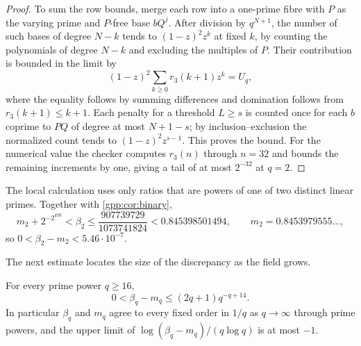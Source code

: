 \begin{proof}
To sum the row bounds, merge each row into a one-prime fibre with $P$ as the varying
prime and $P$-free base $bQ^j$. After division by $q^{N+1}$, the number of such bases of
degree $N-k$ tends to $(1-z)^2z^k$ at fixed $k$, by counting the polynomials of degree
$N-k$ and excluding the multiples of $P$. Their contribution is bounded in the limit by
\[
 (1-z)^2\sum_{k\ge0}r_3(k+1)z^k=U_q,
\]
where the equality follows by summing differences and domination follows from
$r_3(k+1)\le k+1$. Each penalty for a threshold $L\ge s$ is counted once for each $b$
coprime to $PQ$ of degree at most $N+1-s$; by inclusion--exclusion the normalized count
tends to $(1-z)^2z^{s-1}$. This proves the bound. For the numerical value the checker
computes $r_3(n)$ through $n=32$ and bounds the remaining increments by one, giving a
tail of at most $2^{-32}$ at $q=2$.
\end{proof}

The local calculation uses only ratios that are powers of one of two distinct linear
primes. Together with \cref{gpp:cor:binary},
\[
 m_2+2^{-2^{476}}<\beta_2\le\frac{907739729}{1073741824}<0.845398501494,
 \qquad m_2=0.8453979555\ldots,
\]
so $0<\beta_2-m_2<5.46\cdot10^{-7}$.

The next estimate locates the size of the discrepancy as the field grows.

\begin{theorem}\label{gpp:thm:largeq}
For every prime power $q\ge16$,
\[
 0<\beta_q-m_q\le(2q+1)q^{-q+14}.
\]
In particular $\beta_q$ and $m_q$ agree to every fixed order in $1/q$ as $q\to\infty$
through prime powers, and the upper limit of $\log(\beta_q-m_q)/(q\log q)$ is at most
$-1$.
\end{theorem}

